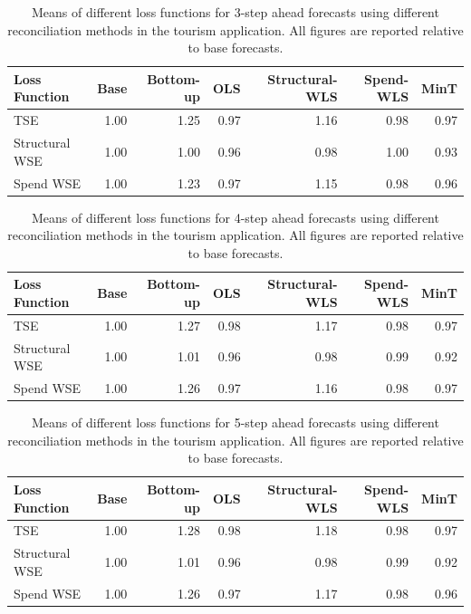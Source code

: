 \documentclass[12pt]{article}
\begin{document}
  	\begin{table}[ht]
  		\centering
  		\begin{tabular}{lrrrrrr}
  			\hline
  			Loss Function & Base & Bottom-up & OLS & Structural-WLS & Spend-WLS & MinT \\ 
  			\hline
  			TSE & 1.00 & 1.25 & 0.97 & 1.16 & 0.98 & 0.97 \\ 
  			Structural WSE & 1.00 & 1.00 & 0.96 & 0.98 & 1.00 & 0.93 \\ 
  			Spend WSE & 1.00 & 1.23 & 0.97 & 1.15 & 0.98 & 0.96 \\ 
  			\hline
  		\end{tabular}
  		\caption{Means of different loss functions for 3-step ahead forecasts using different reconciliation methods in the tourism application.  All figures are reported relative to base forecasts.} 
  	\end{table}
  	
  	\begin{table}[ht]
  		\centering
  		\begin{tabular}{lrrrrrr}
  			\hline
  			Loss Function & Base & Bottom-up & OLS & Structural-WLS & Spend-WLS & MinT \\ 
  			\hline
  			TSE & 1.00 & 1.27 & 0.98 & 1.17 & 0.98 & 0.97 \\ 
  			Structural WSE & 1.00 & 1.01 & 0.96 & 0.98 & 0.99 & 0.92 \\ 
  			Spend WSE & 1.00 & 1.26 & 0.97 & 1.16 & 0.98 & 0.97 \\ 
  			\hline
  		\end{tabular}
  		\caption{Means of different loss functions for 4-step ahead forecasts using different reconciliation methods in the tourism application.  All figures are reported relative to base forecasts.} 
  	\end{table}
  
  \begin{table}[ht]
  	\centering
  	\begin{tabular}{lrrrrrr}
  		\hline
  		Loss Function & Base & Bottom-up & OLS & Structural-WLS & Spend-WLS & MinT \\ 
  		\hline
  		TSE & 1.00 & 1.28 & 0.98 & 1.18 & 0.98 & 0.97 \\ 
  		Structural WSE & 1.00 & 1.01 & 0.96 & 0.98 & 0.99 & 0.92 \\ 
  		Spend WSE & 1.00 & 1.26 & 0.97 & 1.17 & 0.98 & 0.96 \\ 
  		\hline
  	\end{tabular}
  	\caption{Means of different loss functions for 5-step ahead forecasts using different reconciliation methods in the tourism application.  All figures are reported relative to base forecasts.} 
  \end{table}
\end{document}
